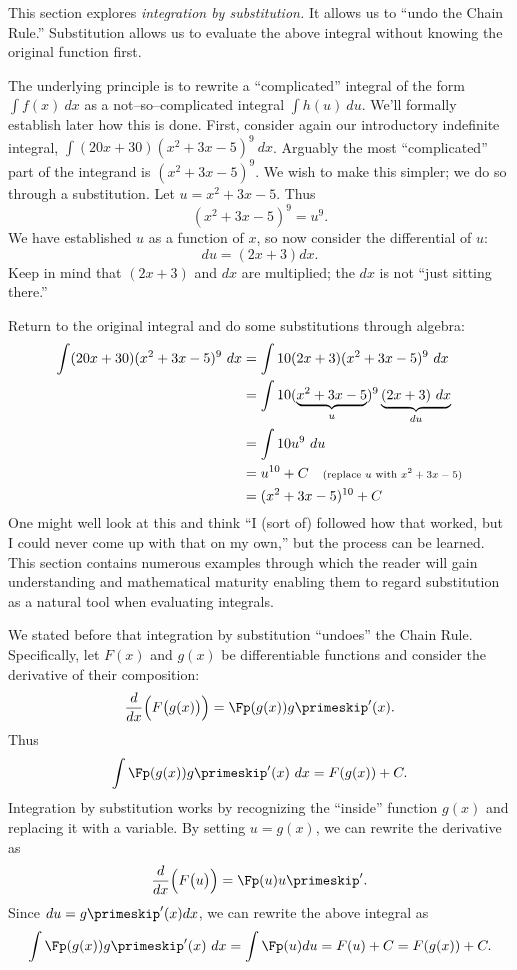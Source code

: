 This section explores \textit{integration by substitution.} It allows us to ``undo the Chain Rule.'' Substitution allows us to evaluate the above integral without knowing the original function first.

The underlying principle is to rewrite a ``complicated'' integral of the form $\int f(x)\ dx$ as a not--so--complicated integral $\int h(u)\ du$. We'll formally establish later how this is done. First, consider again our introductory indefinite integral, $\int (20x+30)(x^2+3x-5)^9\ dx$. Arguably the most ``complicated'' part of the integrand is $(x^2+3x-5)^9$. We wish to make this simpler; we do so through a substitution. Let $u=x^2+3x-5$. Thus $$(x^2+3x-5)^9 = u^9.$$
We have established $u$ as a function of $x$, so now consider the differential of $u$: $$du = (2x+3)dx.$$ Keep in mind that $(2x+3)$ and $dx$ are multiplied; the $dx$ is not ``just sitting there.''

Return to the original integral and do some substitutions through algebra:
\begin{align*}
	\int (20x+30)(x^2+3x-5)^9\ dx 	&=	\int 10(2x+3)(x^2+3x-5)^9\ dx \\
									&=\int 10(\underbrace{x^2+3x-5}_u)^9\underbrace{(2x+3)\ dx}_{du} \\
									&=\int 10u^9\ du \\
									&= u^{10} + C \quad \text{\scriptsize (replace $u$ with $x^2+3x-5$)}\\
									&= (x^2+3x-5)^{10} +C
\end{align*}
One might well look at this and think ``I (sort of) followed how that worked, but I could never come up with that on my own,'' but the process can be learned. This section contains numerous examples through which the reader will gain understanding and mathematical maturity enabling them to regard substitution as a natural tool when evaluating integrals.

We stated before that integration by substitution ``undoes'' the Chain Rule. Specifically, let $F(x)$ and $g(x)$ be differentiable functions and consider the derivative of their composition: 
	$$\frac{d}{dx}\Big(F\big(g(x)\big)\Big) = \Fp(g(x))g\primeskip'(x).$$ Thus 
	$$\int \Fp(g(x))g\primeskip'(x)\ dx = F(g(x)) + C.$$
Integration by substitution works by recognizing the ``inside'' function $g(x)$ and replacing it with a variable. By setting $u=g(x)$, we can rewrite the derivative as
	$$\frac{d}{dx}\Big(F\big(u\big)\Big) = \Fp(u)u\primeskip'.$$
Since $du = g\primeskip'(x)dx$, we can rewrite the above integral as
	$$\int \Fp(g(x))g\primeskip'(x)\ dx = \int \Fp(u) du = F(u)+C = F(g(x))+ C.$$
	
